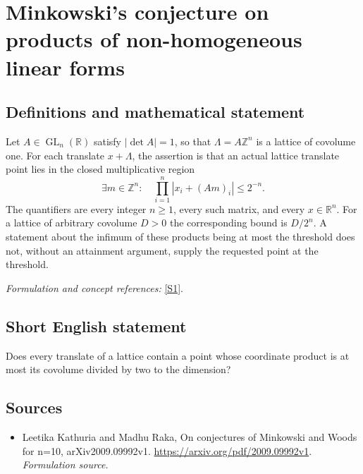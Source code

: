 \documentclass[11pt]{article}
\begin{document}
\section*{\texorpdfstring{Minkowski's conjecture on products of non-homogeneous linear forms}{Minkowski's conjecture on products of non-homogeneous linear forms}}\label{statement}
\subsection{Definitions and mathematical statement}
Let $A\in\operatorname{GL}_n({\mathbb{R}})$ satisfy $|\det A|=1$, so that $\Lambda=A{\mathbb{Z}}^n$ is a lattice of covolume one. For each translate $x+\Lambda$, the assertion is that an actual lattice translate point lies in the closed multiplicative region
\[
 \exists m\in{\mathbb{Z}}^n:\quad \prod_{i=1}^n|x_i+(Am)_i|\le2^{-n}.
\]
The quantifiers are every integer $n\ge1$, every such matrix, and every $x\in{\mathbb{R}}^n$. For a lattice of arbitrary covolume $D>0$ the corresponding bound is $D/2^n$. A statement about the infimum of these products being at most the threshold does not, without an attainment argument, supply the requested point at the threshold.
\par\smallskip\textit{Formulation and concept references:} \href{https://arxiv.org/pdf/2009.09992v1}{[S1]}.

\subsection{Short English statement}
Does every translate of a lattice contain a point whose coordinate product is at most its covolume divided by two to the dimension?
\subsection{Sources}
\begin{itemize}
\item[S1]Leetika Kathuria and Madhu Raka, On conjectures of Minkowski and Woods for n=10, arXiv2009.09992v1.
\url{https://arxiv.org/pdf/2009.09992v1}.
\textit{Formulation source.}
\end{itemize}
\end{document}
